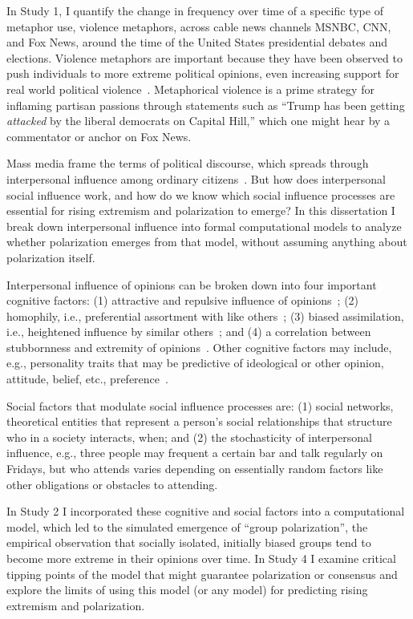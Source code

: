 In Study 1, I quantify the change in frequency over time of a 
specific type of metaphor use, violence metaphors, across cable news channels
MSNBC, CNN, and Fox News, around the time of the United States presidential
debates and elections. Violence metaphors are important because they have
been observed to push individuals to more extreme political opinions, even
increasing support for real world political violence~\cite{Kalmoe2014,Kalmoe2018}.
Metaphorical violence is a prime strategy for inflaming partisan passions 
through statements such as ``Trump has been getting \emph{attacked} by the liberal
democrats on Capital Hill,'' which one might hear by a commentator or anchor on Fox News.

Mass media frame the terms of political discourse, which spreads through
interpersonal influence among ordinary citizens~\cite{Katz1955}. But how does 
interpersonal social influence work, and how do we know which social 
influence processes are essential for rising extremism and polarization to
emerge? In this dissertation I break down interpersonal influence into formal computational
models to analyze whether polarization emerges from that model, without assuming anything
about polarization itself. 

Interpersonal influence of opinions can be broken down into
four important cognitive factors: (1) attractive and repulsive influence of
opinions~\cite{French1956,Cikara2014,Bail2018}; (2) homophily, i.e., preferential assortment with like others~\cite{McPherson2001};
(3) biased assimilation, i.e., heightened influence by similar others~\cite{Dandekar2013}; and
(4) a correlation between stubbornness and extremity of opinions~\cite{Reiss2019,Zmigrod2019a}. 
Other cognitive factors may include, e.g., personality traits that may be predictive of 
ideological or other opinion, attitude, belief, etc., preference~\cite{Zmigrod2018}.

Social factors that modulate social influence processes are: (1) social
networks, theoretical entities that represent a person's social relationships
that structure who in a society interacts, when; and (2) the stochasticity
of interpersonal influence, e.g., three people may frequent a certain bar
and talk regularly on Fridays, but who attends varies depending on essentially
random factors like other obligations or obstacles to attending. 

In Study 2 I incorporated these cognitive and social factors into a 
computational model, which led to the simulated emergence of 
``group polarization'', the empirical 
observation that socially isolated, initially biased groups tend to become
more extreme in their opinions over time. In Study 4 I examine critical
tipping points of the model that might guarantee polarization or consensus and
explore the limits of using this model (or any model) for predicting 
rising extremism and polarization.

